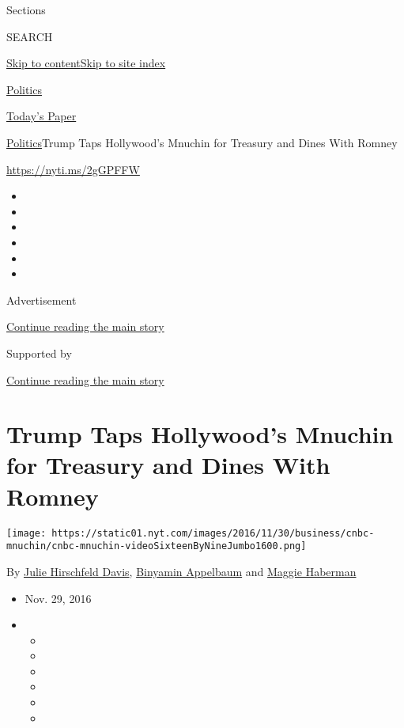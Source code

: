 Sections

SEARCH

\protect\hyperlink{site-content}{Skip to
content}\protect\hyperlink{site-index}{Skip to site index}

\href{https://www.nytimes.com/section/politics}{Politics}

\href{https://myaccount.nytimes.com/auth/login?response_type=cookie\&client_id=vi}{}

\href{https://www.nytimes.com/section/todayspaper}{Today's Paper}

\href{/section/politics}{Politics}\textbar{}Trump Taps Hollywood's
Mnuchin for Treasury and Dines With Romney

\url{https://nyti.ms/2gGPFFW}

\begin{itemize}
\item
\item
\item
\item
\item
\item
\end{itemize}

Advertisement

\protect\hyperlink{after-top}{Continue reading the main story}

Supported by

\protect\hyperlink{after-sponsor}{Continue reading the main story}

\hypertarget{trump-taps-hollywoods-mnuchin-for-treasury-and-dines-with-romney}{%
\section{Trump Taps Hollywood's Mnuchin for Treasury and Dines With
Romney}\label{trump-taps-hollywoods-mnuchin-for-treasury-and-dines-with-romney}}

\texttt{[image: https://static01.nyt.com/images/2016/11/30/business/cnbc-mnuchin/cnbc-mnuchin-videoSixteenByNineJumbo1600.png]}

By \href{https://www.nytimes.com/by/julie-hirschfeld-davis}{Julie
Hirschfeld Davis},
\href{http://www.nytimes.com/by/binyamin-appelbaum}{Binyamin Appelbaum}
and \href{http://www.nytimes.com/by/maggie-haberman}{Maggie Haberman}

\begin{itemize}
\item
  Nov. 29, 2016
\item
  \begin{itemize}
  \item
  \item
  \item
  \item
  \item
  \item
  \end{itemize}
\end{itemize}

